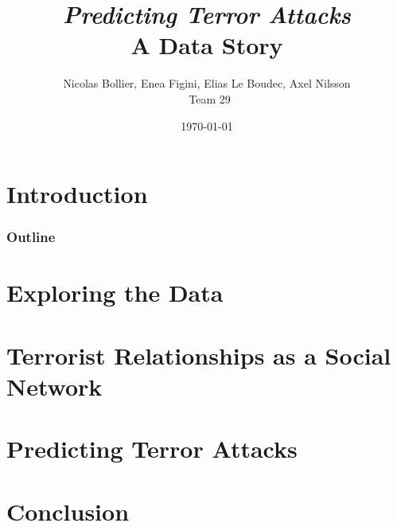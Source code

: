\documentclass{beamer}
\title{\textit{Predicting Terror Attacks} \\A Data Story}
\author{Nicolas Bollier, Enea Figini, Elias Le Boudec, Axel Nilsson\\~Team 29}
\date{\today}
\begin{document}
\frame{\titlepage}


\section{Introduction}


\begin{frame}
\frametitle{Outline}
\tableofcontents
\end{frame}

\section{Exploring the Data}


\section{Terrorist Relationships as a Social Network}


\section{Predicting Terror Attacks}


\section{Conclusion}

\end{document}
